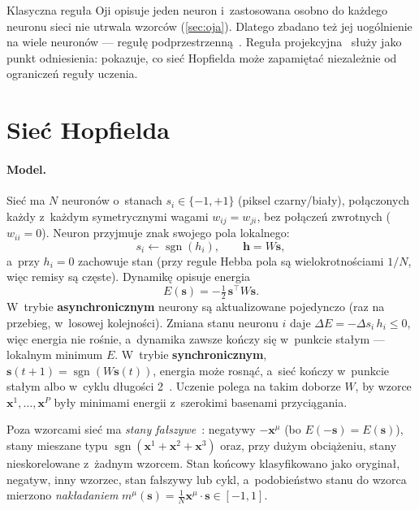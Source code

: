 \documentclass[11pt,a4paper]{article}
\newcommand{\sgn}{\operatorname{sgn}}
\newcommand{\vx}{\mathbf{x}}
\newcommand{\vs}{\mathbf{s}}
\newcommand{\vh}{\mathbf{h}}
\begin{document}
Klasyczna reguła Oji opisuje jeden neuron i~zastosowana osobno do każdego neuronu sieci nie
utrwala wzorców (\cref{sec:oja}). Dlatego zbadano też jej uogólnienie na wiele neuronów ---
regułę podprzestrzenną~\cite{oja1989}. Reguła projekcyjna~\cite{personnaz1985} służy jako
punkt odniesienia: pokazuje, co sieć Hopfielda może zapamiętać niezależnie od ograniczeń
reguły uczenia.

\section{Sieć Hopfielda}
\label{sec:model}

\paragraph{Model.}
Sieć ma $N$ neuronów o~stanach $s_i\in\{-1,+1\}$ (piksel czarny/biały), połączonych każdy
z~każdym symetrycznymi wagami $w_{ij}=w_{ji}$, bez połączeń zwrotnych ($w_{ii}=0$). Neuron
przyjmuje znak swojego pola lokalnego:
\begin{equation}
  s_i \leftarrow \sgn(h_i), \qquad \vh = W\vs ,
  \label{eq:update}
\end{equation}
a~przy $h_i=0$ zachowuje stan (przy regule Hebba pola są wielokrotnościami $1/N$, więc remisy
są częste). Dynamikę opisuje energia
\begin{equation}
  E(\vs) = -\tfrac12\,\vs^\top W \vs .
  \label{eq:energy}
\end{equation}
W~trybie \textbf{asynchronicznym} neurony są aktualizowane pojedynczo (raz na przebieg,
w~losowej kolejności). Zmiana stanu neuronu $i$ daje $\Delta E=-\Delta s_i\,h_i\le0$, więc
energia nie rośnie, a~dynamika zawsze kończy się w~punkcie stałym --- lokalnym minimum $E$.
W~trybie \textbf{synchronicznym}, $\vs(t+1)=\sgn(W\vs(t))$, energia może rosnąć, a~sieć kończy
w~punkcie stałym albo w~cyklu długości 2~\cite{bruck1990}. Uczenie polega na takim doborze $W$,
by wzorce $\vx^1,\dots,\vx^P$ były minimami energii z~szerokimi basenami przyciągania.

Poza wzorcami sieć ma \emph{stany fałszywe}~\cite{hertz1991}: negatywy $-\vx^\mu$ (bo
$E(-\vs)=E(\vs)$), stany mieszane typu $\sgn(\vx^1+\vx^2+\vx^3)$ oraz, przy dużym obciążeniu,
stany nieskorelowane z~żadnym wzorcem. Stan końcowy klasyfikowano jako oryginał, negatyw, inny
wzorzec, stan fałszywy lub cykl, a~podobieństwo stanu do wzorca mierzono \emph{nakładaniem}
$m^\mu(\vs)=\frac1N\vx^\mu\cdot\vs\in[-1,1]$.
\end{document}
